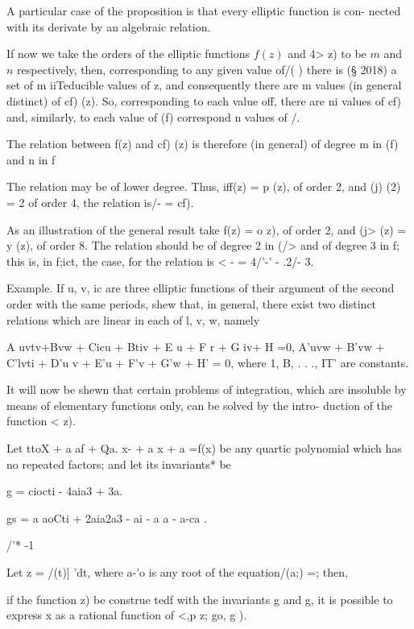 {A particular case of the proposition is that every elliptic function
is con- nected with its derivate by an algebraic relation.

If now we take the orders of the elliptic functions $f(z)$ and 4> z) to
be $m$ and $n$ respectively, then, corresponding to any given value of/( )
there is (§ 2018) a set of m iiTeducible values of z, and consequently
there are m values (in general distinct) of cf) (z). So, corresponding
to each value off, there are ni values of cf) and, similarly, to each
value of (f) correspond n values of /.

The relation between f(z) and cf) (z) is therefore (in general) of
degree m in (f) and n in f

The relation may be of lower degree. Thus, iff(z) = p (z), of order 2,
and (j) (2) = 2 of order 4, the relation is/- = cf).

As an illustration of the general result take f(z) = o z), of order 2,
and (j> (z) = y (z), of order 8. The relation should be of degree 2 in
(/> and of degree 3 in f; this is, in f;ict, the case, for the
relation is < - = 4/'-' - .2/- 3.

Example. If u, v, ic are three elliptic functions of their argument of
the second order with the same periods, shew that, in general, there
exist two distinct relations which are linear in each of l, v, w,
namely

A uvtv+Bvw + Cicu + Btiv + E u + F r + G iv+ H =0, A'uvw + B'vw +
C'lvti + D'u v + E'u + F'v + G'w + H' = 0, where 1, B, . . ., IT'
are constants.


It will now be shewn that certain problems of integration, which are
insoluble by means of elementary functions only, can be solved by the
intro- duction of the function < z).

%
%

Let ttoX + a af + Qa. x- + a x + a =f(x) be any quartic polynomial
which has no repeated factors; and let its invariants* be

g = ciocti - 4aia3 + 3a.

gs = a aoCti + 2aia2a3 - ai - a a - a-ca .

/'* -1

Let z = /(t)] 'dt, where a-'o is any root of the equation/(a;) =;
then,

if the function z) be construe tedf with the invariants g and g, it
is possible to express x as a rational function of <,p z; go, g ).

}

